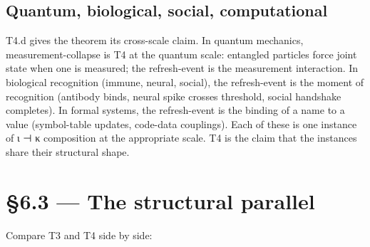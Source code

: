 \documentclass[11pt, openany]{book}
\newcommand{\sectionbreak}{\clearpage}
\begin{document}
\subsection{Quantum, biological, social, computational}

T4.d gives the theorem its cross-scale claim. In quantum mechanics, measurement-collapse is T4 at the quantum scale: entangled particles force joint state when one is measured; the refresh-event is the measurement interaction. In biological recognition (immune, neural, social), the refresh-event is the moment of recognition (antibody binds, neural spike crosses threshold, social handshake completes). In formal systems, the refresh-event is the binding of a name to a value (symbol-table updates, code-data couplings). Each of these is one instance of ι ⊣ κ composition at the appropriate scale. T4 is the claim that the instances share their structural shape.

\sectionbreak

\section{§6.3 --- The structural parallel}

Compare T3 and T4 side by side:
\end{document}
